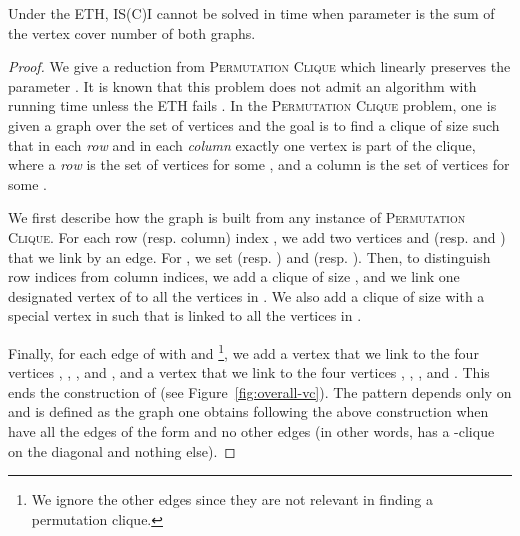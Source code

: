 \begin{theorem}
Under the ETH, IS(C)I cannot be solved in time  when parameter  is the sum of the vertex cover number of both graphs.
\end{theorem}

\begin{proof}
We give a reduction from  \textsc{Permutation Clique} which linearly preserves the parameter .
It is known that this problem does not admit an algorithm with running time  unless the ETH fails \cite{Lokshtanov2011}.
In the  \textsc{Permutation Clique} problem, one is given a graph over the set of vertices  and the goal is to find a clique of size  such that in each \emph{row} and in each \emph{column} exactly one vertex is part of the clique, where a \emph{row} is the set of vertices  for some , and a column is the set of vertices  for some .

We first describe how the graph  is built from any instance  of  \textsc{Permutation Clique}.
For each row (resp. column) index , we add two vertices  and  (resp.  and ) that we link by an edge.
For , we set  (resp. ) and  (resp. ).
Then, to distinguish row indices from column indices, we add a clique  of size , and we link one designated vertex  of  to all the vertices in .
We also add a clique  of size  with a special vertex  in  such that  is linked to all the vertices in .

Finally, for each edge  of  with  and  \footnote{We ignore the other edges since they are not relevant in finding a permutation clique.}, we add a vertex  that we link to the four vertices , , , and , and a vertex  that we link to the four vertices , , , and .
This ends the construction of  (see Figure~\ref{fig:overall-vc}).
The pattern  depends only on  and is defined as the graph one obtains following the above construction when  have all the edges of the form  and no other edges (in other words,  has a -clique on the diagonal and nothing else). 


\end{proof}

